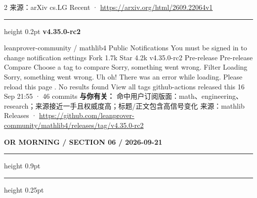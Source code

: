 \documentclass[10.5pt]{ctexart}
\begin{document}
\begin{multicols}{2}
{\footnotesize\color{ormuted} 来源：arXiv cs.LG Recent · \url{https://arxiv.org/html/2609.22064v1}}
\vspace{2mm}
\hrule height 0.2pt
\vspace{2mm}
{\large\bfseries v4.35.0-rc2}\par
leanprover-community / mathlib4 Public Notifications You must be signed in to change notification settings Fork 1.7k Star 4.2k v4.35.0-rc2 Pre-release Pre-release Compare Choose a tag to compare Sorry, something went wrong. Filter Loading Sorry, something went wrong. Uh oh! There was an error while loading. Please reload this page . No results found View all tags github-actions released this 16 Sep 21:55 · 46 commits
\textbf{与你有关：} 命中用户订阅版面：math、engineering、research；来源接近一手且权威度高；标题/正文包含高信号变化
{\footnotesize\color{ormuted} 来源：mathlib Releases · \url{https://github.com/leanprover-community/mathlib4/releases/tag/v4.35.0-rc2}}
\end{multicols}
\newpage
{\small\bfseries OR MORNING / SECTION 06 / 2026-09-21}
\vspace{2mm}
\hrule height 0.9pt
\vspace{1.5mm}
\hrule height 0.25pt
\vspace{4mm}
\end{document}
